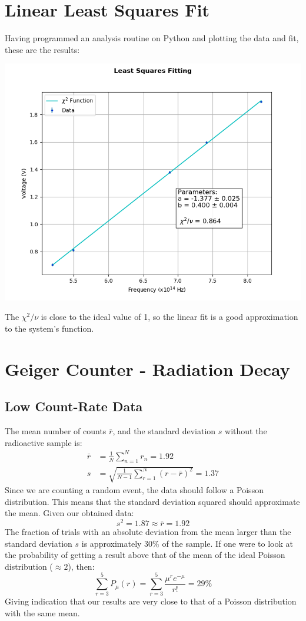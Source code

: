 \documentclass[twocolumn]{article}
\begin{document}
 \section{Linear Least Squares Fit}
 Having programmed an analysis routine on Python and plotting the data and fit, these are the results:
 \centerline{\includegraphics[scale = 0.6]{fig2}}
 The $\chi^2 / \nu$ is close to the ideal value of 1, so the linear fit is a good approximation to the system's function.
 \newpage
 \section{Geiger Counter - Radiation Decay}
 \subsection{Low Count-Rate Data}
 The mean number of counts $\bar{r}$, and the standard deviation $s$ without the radioactive sample is:
 \begin{align*}
 \bar{r} &= \frac{1}{N} \sum_{n=1}^{N} r_n = 1.92 \\
 s &= \sqrt{ \frac{1}{N-1}\sum_{r=1}^{N}(r - \bar{r})^2} = 1.37
 \end{align*}
 Since we are counting a random event, the data should follow a Poisson distribution. This means that the standard deviation squared should approximate the mean.
 Given our obtained data:
 \begin{equation*}
  s^2 = 1.87 \approx \bar{r} = 1.92 
 \end{equation*}
  The fraction of trials with an absolute deviation from the mean larger than the standard deviation $s$ is approximately $30\%$ of the sample. If one were to look at the
  probability of getting a result above that of the mean of the ideal Poisson distribution ($\approx 2$), then:
 \begin{equation*}
  \sum_{r=3}^{5} P_\mu(r) = \sum_{r=3}^{5} \frac{\mu^re^{-\mu}}{r!} = 29\%
 \end{equation*}
 Giving indication that our results are very close to that of a Poisson distribution with the same mean.
 
\end{document}
